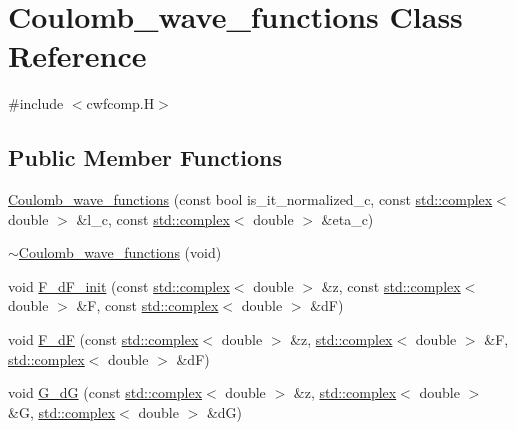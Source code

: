 \hypertarget{classCoulomb__wave__functions}{\section{Coulomb\-\_\-wave\-\_\-functions Class Reference}
\label{classCoulomb__wave__functions}
}


{\ttfamily \#include $<$cwfcomp.\-H$>$}

\subsection*{Public Member Functions}
\begin{DoxyCompactItemize}
\item 
\hyperlink{classCoulomb__wave__functions_ac1d33cc04d9c2629d0339772277a9cc8}{Coulomb\-\_\-wave\-\_\-functions} (const bool is\-\_\-it\-\_\-normalized\-\_\-c, const \hyperlink{Constants_8h_a1c1b16cc02d518bbe753449171ab7033}{std\-::complex}$<$ double $>$ \&l\-\_\-c, const \hyperlink{Constants_8h_a1c1b16cc02d518bbe753449171ab7033}{std\-::complex}$<$ double $>$ \&eta\-\_\-c)
\item 
\hyperlink{classCoulomb__wave__functions_a22b1bddeeeeaeb8ef0ea7fab9084fbf3}{$\sim$\-Coulomb\-\_\-wave\-\_\-functions} (void)
\item 
void \hyperlink{classCoulomb__wave__functions_a6b3367113a7be7ef3b23b15a24dccceb}{F\-\_\-d\-F\-\_\-init} (const \hyperlink{Constants_8h_a1c1b16cc02d518bbe753449171ab7033}{std\-::complex}$<$ double $>$ \&z, const \hyperlink{Constants_8h_a1c1b16cc02d518bbe753449171ab7033}{std\-::complex}$<$ double $>$ \&F, const \hyperlink{Constants_8h_a1c1b16cc02d518bbe753449171ab7033}{std\-::complex}$<$ double $>$ \&d\-F)
\item 
void \hyperlink{classCoulomb__wave__functions_aa50c907890ba95453087824914c3a90b}{F\-\_\-d\-F} (const \hyperlink{Constants_8h_a1c1b16cc02d518bbe753449171ab7033}{std\-::complex}$<$ double $>$ \&z, \hyperlink{Constants_8h_a1c1b16cc02d518bbe753449171ab7033}{std\-::complex}$<$ double $>$ \&F, \hyperlink{Constants_8h_a1c1b16cc02d518bbe753449171ab7033}{std\-::complex}$<$ double $>$ \&d\-F)
\item 
void \hyperlink{classCoulomb__wave__functions_a290186f37ddca40667af2a0acb031fcb}{G\-\_\-d\-G} (const \hyperlink{Constants_8h_a1c1b16cc02d518bbe753449171ab7033}{std\-::complex}$<$ double $>$ \&z, \hyperlink{Constants_8h_a1c1b16cc02d518bbe753449171ab7033}{std\-::complex}$<$ double $>$ \&G, \hyperlink{Constants_8h_a1c1b16cc02d518bbe753449171ab7033}{std\-::complex}$<$ double $>$ \&d\-G)

\end{DoxyCompactItemize}
